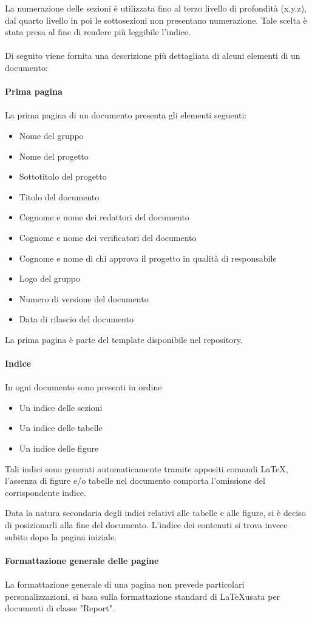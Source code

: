 \documentclass[a4paper]{report}
\begin{document}
	La numerazione delle sezioni è utilizzata fino al terzo livello di profondità (x.y.z), dal quarto livello in poi le sottosezioni non 
	presentano numerazione. Tale scelta è stata presa al fine di rendere più leggibile l'indice.
	\\ \\
	Di seguito viene fornita una descrizione più dettagliata di alcuni elementi di un documento: \\ \\
	\textbf{Prima pagina} \\ \\ 
	La prima pagina di un documento presenta gli elementi seguenti:
	\begin{itemize}
		\item Nome del gruppo
		\item Nome del progetto
		\item Sottotitolo del progetto
		\item Titolo del documento
		\item Cognome e nome dei redattori del documento
		\item Cognome e nome dei verificatori del documento
		\item Cognome e nome di chi approva il progetto in qualità di responsabile
		\item Logo del gruppo
		\item Numero di versione del documento
		\item Data di rilascio del documento
	\end{itemize}
	La prima pagina è parte del template disponibile nel repository. \\ \\
	\textbf{Indice} \\ \\
	In ogni documento sono presenti in ordine
	\begin{itemize}
		\item Un indice delle sezioni
		\item Un indice delle tabelle
		\item Un indice delle figure
	\end{itemize}
	Tali indici sono generati automaticamente tramite appositi comandi \LaTeX, l'assenza di figure 
	e/o tabelle nel documento comporta l'omissione del corrispondente indice. 
	
	Data la natura secondaria degli indici relativi alle tabelle e alle figure, si è deciso di posizionarli alla fine del documento.
	L'indice dei contenuti si trova invece subito dopo la pagina iniziale.	
	\\ \\
	\textbf{Formattazione generale delle pagine} \\ \\
	La formattazione generale di una pagina non prevede particolari personalizzazioni, si basa 
	sulla formattazione standard di \LaTeX \space usata per documenti di classe "Report". 
\end{document}
